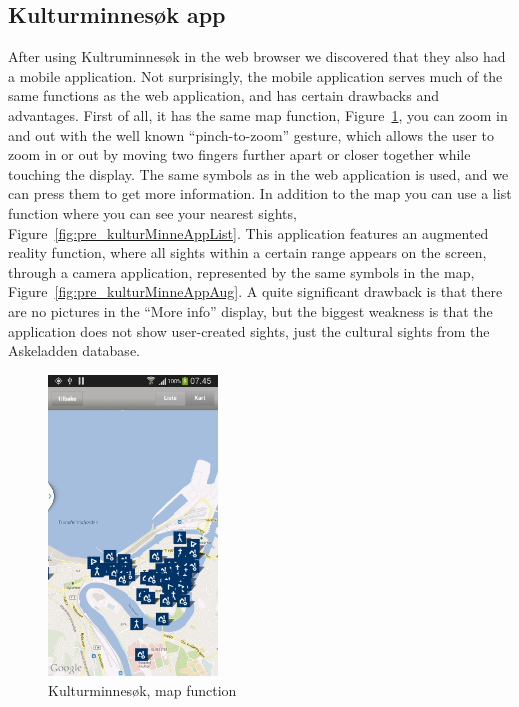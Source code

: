 \documentclass[11pt]{book}
\begin{document}
\subsection{Kulturminnesøk app}
After using Kultruminnesøk in the web browser we discovered that they also had a mobile application. Not surprisingly, the mobile application serves much of the same functions as the web application, and has certain drawbacks and  advantages. First of all, it has the same map function, Figure~\ref{fig:pre_kulturMinneAppMap}, you can zoom in and out with the well known ``pinch-to-zoom'' gesture, which allows the user to zoom in or out by moving two fingers further apart or closer together while touching the display. The same symbols as in the web application is used, and we can press them to get more information. In addition to the map you can use a list function where you can see your nearest sights, Figure~\ref{fig:pre_kulturMinneAppList}. This application features an augmented reality function, where all sights within a certain range appears on the screen, through a camera application, represented by the same symbols in the map, Figure~\ref{fig:pre_kulturMinneAppAug}.  A quite significant drawback is that there are no pictures in the ``More info'' display, but the biggest weakness is that the application does not show user-created sights, just the cultural sights from the Askeladden database.

\begin{figure}[H]
      \centering
      \includegraphics[width=0.4\textwidth]{Figures/Prestudy/kulturSokMap.png}
      \caption{Kulturminnesøk, map function}
      \label{fig:pre_kulturMinneAppMap}
\end{figure}
\end{document}
